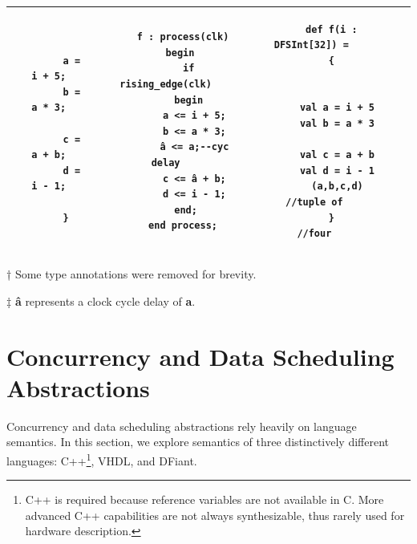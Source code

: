 \begin{table}[t]
\begin{threeparttable}
\begin{tabular}{|c|c|c|c|c|}
\begin{minipage}[b]{0.18\linewidth}
\begin{verbatim}
      
        a = i + 5;
        b = a * 3;
      
        c = a + b;
        d = i - 1;

      }
		\end{verbatim}
	\end{minipage}
	&
	\begin{minipage}[b]{0.18\linewidth}
		\begin{verbatim}
      f : process(clk)
      begin 
        if rising_edge(clk)
        begin
          a <= i + 5;
          b <= a * 3;
          â <= a;--cyc delay
          c <= â + b;
          d <= i - 1;
        end; 
      end process;
		\end{verbatim}
	\end{minipage}
	&
	\begin{minipage}[b]{0.19\linewidth}
		\begin{verbatim}
      def f(i : DFSInt[32]) = 
      {
      
      
        val a = i + 5
        val b = a * 3
      
        val c = a + b
        val d = i - 1
        (a,b,c,d) //tuple of
      }           //four
		\end{verbatim}
	\end{minipage}
  \\
  \hline
  \end{tabular}
  \begin{tablenotes}
    \item [†] Some type annotations were removed for brevity.
    \item [‡] \textbf{â} represents a clock cycle delay of \textbf{a}.
  \end{tablenotes}
  \end{threeparttable}
\end{table}%

\section{Concurrency and Data Scheduling Abstractions}
\label{sec:concurrency_abstractions}

Concurrency and data scheduling abstractions rely heavily on language semantics. In this section, we explore semantics of three distinctively different languages: C++\footnote{C++ is required because reference \code{\&} variables are not available in C. More advanced C++ capabilities are not always synthesizable, thus rarely used for hardware description.}, VHDL, and DFiant. 

